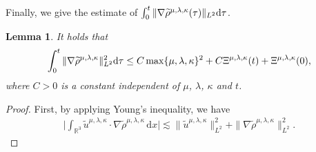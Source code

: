 \documentclass[reqno,11pt]{amsart}
\theoremstyle{plain}
\newtheorem{lem}[thm]{Lemma}
\numberwithin{equation}{section}
\begin{document}
Finally, we give the estimate of $\int^t_0 \| \nabla\widetilde\rho^{\mu,\lambda,\kappa}(\tau)\|_{L^2} {\rm d}\tau$.
\begin{lem}\label{L4.4}
It holds that
\begin{align}\label{G4.35}
\int_0^t \|\nabla \widetilde{\rho}^{\mu,\lambda,\kappa}
\|_{L^2}^2{\rm d}\tau\leq C\max\{\mu,\lambda,\kappa\}^2+C {\Xi} ^{\mu,\lambda,\kappa}(t)+{\Xi} ^{\mu,\lambda,\kappa}(0),
\end{align}
where $C>0$ is a constant independent of   $\mu$, $\lambda$, $\kappa$ and   $t$.
\end{lem}
\begin{proof}
First,   by applying Young's inequality, we have 
\begin{align}\label{G4.36}
\Big|\int_{\mathbb{R}^3} \widetilde{u}^{\mu,\lambda,\kappa} \cdot \nabla \widetilde{\rho}^{\mu,\lambda,\kappa} \, \mathrm{d}x\Big|  \lesssim \|\widetilde{u}^{\mu,\lambda,\kappa}\|_{L^2}^2+\|\nabla\widetilde{\rho}^{\mu,\lambda,\kappa}\|_{L^2}^2.    
\end{align}


\end{proof}
\end{document}
